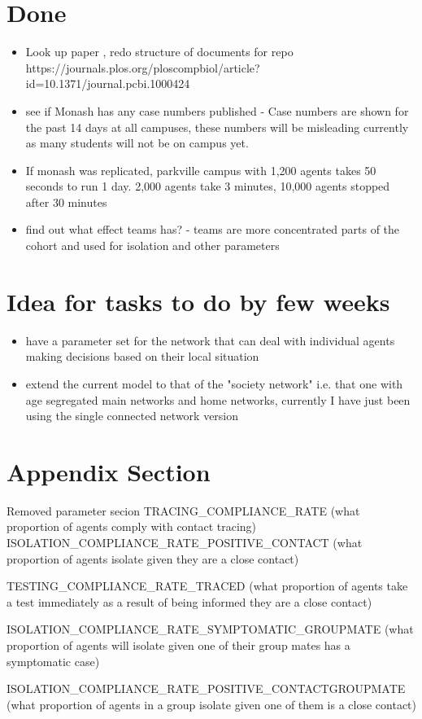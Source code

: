 \documentclass{article}
\begin{document}
\section{Done}
\begin{itemize}
\item Look up paper , redo structure of documents for repo https://journals.plos.org/ploscompbiol/article?id=10.1371/journal.pcbi.1000424

\item see if Monash has any case numbers published - Case numbers are shown for the past 14 days at all campuses, these numbers will be misleading currently as many students will not be on campus yet.  
\item If monash was replicated, parkville campus with 1,200 agents takes 50 seconds to run 1 day. 2,000 agents take 3 minutes, 10,000 agents stopped after 30 minutes

\item find out what effect teams has? - teams are more concentrated parts of the cohort and used for isolation and other parameters
\end{itemize}
\section{Idea for tasks to do by few weeks}
\begin{itemize}
\item have a parameter set for the network that can deal with individual agents making decisions based on their local situation
\item extend the current model to that of the "society network" i.e. that one with age segregated main networks and home networks, currently I have just been using the single connected network version 
\end{itemize}


\section{Appendix Section}

Removed parameter secion
TRACING\_COMPLIANCE\_RATE (what proportion of agents comply with contact tracing)
ISOLATION\_COMPLIANCE\_RATE\_POSITIVE\_CONTACT (what proportion of agents isolate given they are a close contact)

TESTING\_COMPLIANCE\_RATE\_TRACED (what proportion of agents take a test immediately as a result of being informed they are a close contact)


\item ISOLATION\_COMPLIANCE\_RATE\_SYMPTOMATIC\_GROUPMATE (what proportion of agents will isolate given one of their group mates has a symptomatic case)

\item ISOLATION\_COMPLIANCE\_RATE\_POSITIVE\_CONTACTGROUPMATE (what proportion of agents in a group isolate given one of them is a close contact)
\end{document}
